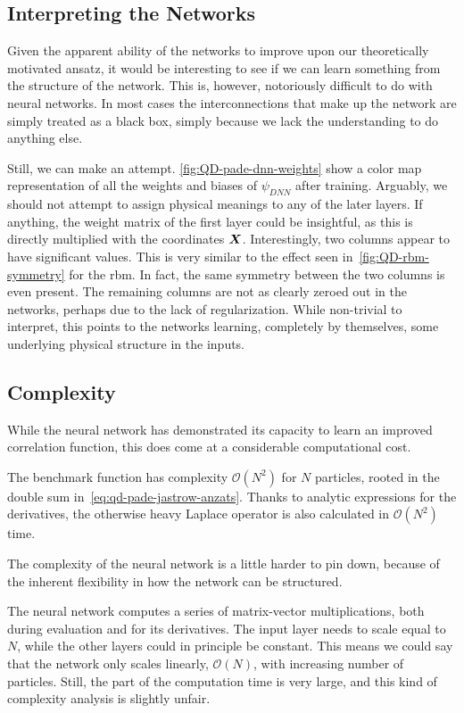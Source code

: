 \documentclass[Thesis.tex]{subfiles}
\begin{document}
\subsection{Interpreting the Networks}

Given the apparent ability of the networks to improve upon our theoretically
motivated ansatz, it would be interesting to see if we can learn something from
the structure of the network. This is, however, notoriously difficult to do with
neural networks. In most cases the interconnections that make up the network are
simply treated as a black box, simply because we lack the understanding to do
anything else.

Still, we can make an attempt. \cref{fig:QD-pade-dnn-weights} show a color map
representation of all the weights and biases of $\psi_{DNN}$ after training.
Arguably, we should not attempt to assign physical meanings to any of the later
layers. If anything, the weight matrix of the first layer could be insightful,
as this is directly multiplied with the coordinates $\bm{X}$. Interestingly,
two columns appear to have significant values. This is very similar to the
effect seen in~\cref{fig:QD-rbm-symmetry} for the \gls{rbm}. In fact, the same
symmetry between the two columns is even present. The remaining columns are not
as clearly zeroed out in the networks, perhaps due to the lack of
regularization. While non-trivial to interpret, this points to the networks
learning, completely by themselves, some underlying physical structure in the
inputs.



\subsection{Complexity}

While the neural network has demonstrated its capacity to learn an improved
correlation function, this does come at a considerable computational cost.

The benchmark function has complexity $\mathcal{O}(N^2)$ for $N$ particles,
rooted in the double sum in~\cref{eq:qd-pade-jastrow-anzats}. Thanks to
analytic expressions for the derivatives, the otherwise heavy Laplace operator
is also calculated in $\mathcal{O}(N^2)$ time.

The complexity of the neural network is a little harder to pin down, because of
the inherent flexibility in how the network can be structured.

The neural network computes a series of matrix-vector multiplications, both during
evaluation and for its derivatives. The input layer needs to scale equal to $N$,
while the other layers could in principle be constant. This means we could say
that the network only scales linearly, $\mathcal{O}(N)$, with increasing number
of particles. Still, the  part of the computation time is very
large, and this kind of complexity analysis is slightly unfair.
\end{document}
